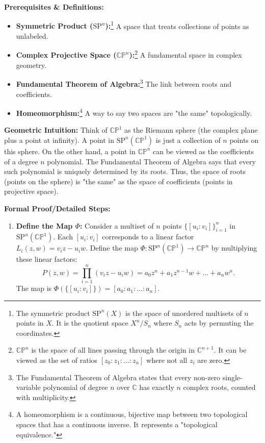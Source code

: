 \begin{solution}
\textbf{Prerequisites \& Definitions:}
\begin{itemize}
    \item \textbf{Symmetric Product ($\mathrm{SP}^n$):}\footnote{The symmetric product $\mathrm{SP}^n(X)$ is the space of unordered multisets of $n$ points in $X$. It is the quotient space $X^n / S_n$ where $S_n$ acts by permuting the coordinates.} A space that treats collections of points as unlabeled.
    \item \textbf{Complex Projective Space ($\mathbb{CP}^n$):}\footnote{$\mathbb{CP}^n$ is the space of all lines passing through the origin in $\mathbb{C}^{n+1}$. It can be viewed as the set of ratios $[z_0 : z_1 : \dots : z_n]$ where not all $z_i$ are zero.} A fundamental space in complex geometry.
    \item \textbf{Fundamental Theorem of Algebra:}\footnote{The Fundamental Theorem of Algebra states that every non-zero single-variable polynomial of degree $n$ over $\mathbb{C}$ has exactly $n$ complex roots, counted with multiplicity.} The link between roots and coefficients.
    \item \textbf{Homeomorphism:}\footnote{A homeomorphism is a continuous, bijective map between two topological spaces that has a continuous inverse. It represents a "topological equivalence."} A way to say two spaces are "the same" topologically.
\end{itemize}

\textbf{Geometric Intuition:}
Think of $\mathbb{CP}^1$ as the Riemann sphere (the complex plane plus a point at infinity). A point in $\mathrm{SP}^n(\mathbb{CP}^1)$ is just a collection of $n$ points on this sphere. On the other hand, a point in $\mathbb{CP}^n$ can be viewed as the coefficients of a degree $n$ polynomial. The Fundamental Theorem of Algebra says that every such polynomial is uniquely determined by its roots. Thus, the space of roots (points on the sphere) is "the same" as the space of coefficients (points in projective space).

\textbf{Formal Proof/Detailed Steps:}
\begin{enumerate}
    \item \textbf{Define the Map $\Phi$:}
    Consider a multiset of $n$ points $\{[u_i : v_i]\}_{i=1}^n$ in $\mathrm{SP}^n(\mathbb{CP}^1)$. Each $[u_i : v_i]$ corresponds to a linear factor $L_i(z, w) = v_i z - u_i w$.
    Define the map $\Phi: \mathrm{SP}^n(\mathbb{CP}^1) \to \mathbb{CP}^n$ by multiplying these linear factors:
    \[ P(z, w) = \prod_{i=1}^n (v_i z - u_i w) = a_0 z^n + a_1 z^{n-1} w + \dots + a_n w^n. \]
    The map is $\Phi(\{[u_i : v_i]\}) = [a_0 : a_1 : \dots : a_n]$.
    

\end{enumerate}
\end{solution}
